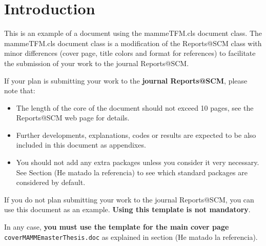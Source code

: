\section{Introduction}

This is an example of a document using the mammeTFM.cls document class. The mammeTFM.cls document class is a modification of the Reports@SCM class with minor differences (cover page, title colors and format for references) to facilitate the submission of your work to the journal Reports@SCM.

If your plan is submitting your work to the \textbf{journal Reports@SCM}, please note that:
\begin{itemize}
	\item The length of the core of the document should not exceed 10 pages, see the Reports@SCM web page for details.
	\item Further developments, explanations, codes or results are expected to be also included in this document as appendixes.
	\item You should not add any extra packages unless you consider it very necessary. See Section (He matado la referencia) to see which standard packages  are considered by default.
\end{itemize}

If you do not plan submitting your work to the journal  Reports@SCM, you can use this document as an example. \textbf{Using this template is not mandatory}.

In any case, \textbf{you must use the template for the main cover page} \texttt{coverMAMMEmasterThesis.doc} as explained in section (He matado la referencia).